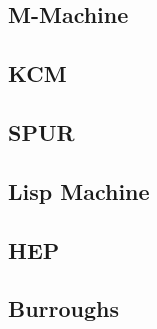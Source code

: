 \subsection{M-Machine}

\subsection{KCM}

\subsection{SPUR}

\subsection{Lisp Machine}

\subsection{HEP}

\subsection{Burroughs}







































